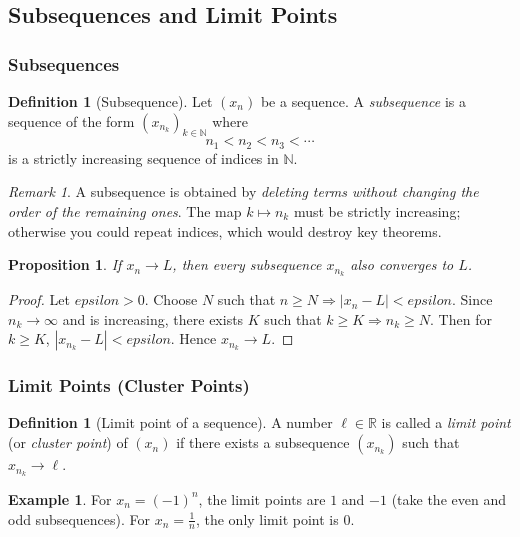 \documentclass[12pt]{article}
\numberwithin{equation}{section}
\def\abs#1{|#1|}
\def\eps{epsilon}
\newcommand{\RR}{\mathbb{R}}
\newcommand{\NN}{\mathbb{N}}
\DeclarePairedDelimiter{\abs}{\lvert}{\rvert}
\newcommand{\eps}{\varepsilon}               %
\theoremstyle{plain}
\newtheorem{proposition}[theorem]{Proposition}
\theoremstyle{definition}
\newtheorem{definition}[theorem]{Definition}
\newtheorem{example}[theorem]{Example}
\theoremstyle{remark}
\newtheorem{remark}[theorem]{Remark}
\begin{document}
\newpage

\subsection{Subsequences and Limit Points}

\subsubsection{Subsequences}

\begin{definition}[Subsequence]
Let $(x_n)$ be a sequence. A \emph{subsequence} is a sequence of the form $(x_{n_k})_{k\in\NN}$ where
\[
n_1<n_2<n_3<\cdots
\]
is a strictly increasing sequence of indices in $\NN$.
\end{definition}

\begin{remark}
A subsequence is obtained by \emph{deleting terms without changing the order of the remaining ones}.
The map $k\mapsto n_k$ must be strictly increasing; otherwise you could repeat indices, which would destroy key theorems.
\end{remark}

\begin{proposition}\label{prop:subsequence-limit}
If $x_n\to L$, then every subsequence $x_{n_k}$ also converges to $L$.
\end{proposition}

\begin{proof}
Let $\eps>0$. Choose $N$ such that $n\ge N\Rightarrow \abs{x_n-L}<\eps$.
Since $n_k\to\infty$ and is increasing, there exists $K$ such that $k\ge K\Rightarrow n_k\ge N$.
Then for $k\ge K$, $\abs{x_{n_k}-L}<\eps$. Hence $x_{n_k}\to L$.
\end{proof}

\subsubsection{Limit Points (Cluster Points)}

\begin{definition}[Limit point of a sequence]\label{def:limit-point}
A number $\ell\in\RR$ is called a \emph{limit point} (or \emph{cluster point}) of $(x_n)$ if there exists a subsequence $(x_{n_k})$ such that $x_{n_k}\to \ell$.
\end{definition}

\begin{example}
For $x_n=(-1)^n$, the limit points are $1$ and $-1$ (take the even and odd subsequences).
For $x_n=\frac{1}{n}$, the only limit point is $0$.
\end{example}
\end{document}
